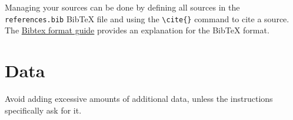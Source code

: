 \documentclass[a4paper, onecolumn, 12pt]{IEEEtran}
\begin{document}
Managing your sources can be done by defining all sources in the \verb|references.bib| BibTeX file and using the \verb|\cite{}| command to cite a source. The \href{https://www.bibtex.com/g/bibtex-format/}{Bibtex format guide} provides an explanation for the BibTeX format. 


\section{Data}
\label{app:data}

Avoid adding excessive amounts of additional data, unless the instructions specifically ask for it.
\end{document}
